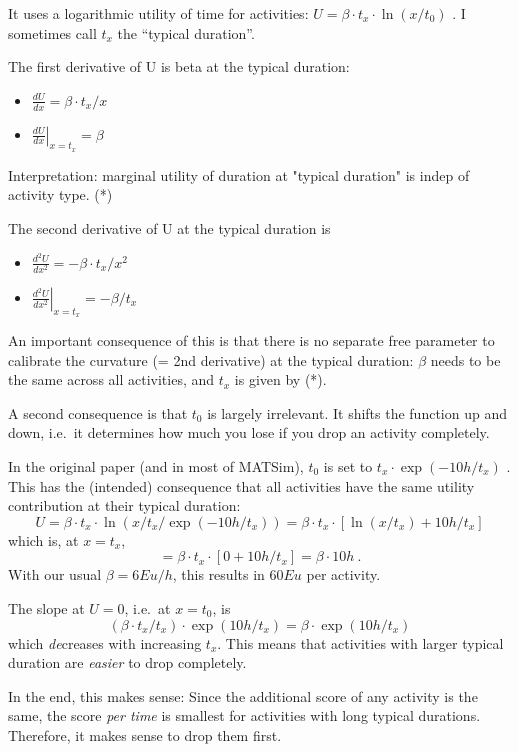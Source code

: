 It uses a logarithmic utility of time for activities: $U = \beta \cdot t_x \cdot  \ln(x/t_0)$ . I sometimes call $t_x$ the ``typical duration''.

The first derivative of U is beta at the typical duration:
\begin{itemize}
	\item 
$\displaystyle
\frac{dU}{dx} = \beta \cdot t_x / x
$
	\item 
$\displaystyle
\left. \frac{dU}{dx}\right|_{x=t_x} = \beta
$
\end{itemize}

Interpretation: marginal utility of duration at "typical duration" is indep of activity type. (*)

The second derivative of U at the typical duration is
\begin{itemize}
	\item 
$\displaystyle
\frac{d^2U}{dx^2} = - \beta \cdot t_x / x^2
$
	\item 
$\displaystyle
\left. \frac{d^2U}{dx^2} \right|_{x=t_x} = - \beta / t_x
$
\end{itemize}

An  important consequence of this is that there is no separate  free  parameter to calibrate the curvature (= 2nd derivative) at the  typical  duration: $\beta$ needs to be the same across all activities, and  $t_x$ is  given by (*).

A second consequence is that $t_0$ is largely  irrelevant. It  shifts the function up and down, i.e.\ it determines how  much you lose  if you drop an activity completely.

In the  original paper (and in most of MATSim), $t_0$ is set to $t_x \cdot   \exp(-10h/t_x)$ . This has the (intended) consequence that all  activities  have the same utility contribution at their typical  duration:
\[
U = \beta \cdot t_x \cdot \ln( x / t_x / \exp(-10h/t_x) ) 
%
= \beta \cdot t_x \cdot [ \ln( x/t_x ) + 10h/t_x ]
\]
which   is, at $x=t_x$,
\[
= \beta \cdot t_x \cdot [ 0 + 10h/t_x ] = \beta \cdot  10h \ . 
\]
With  our usual $\beta = 6Eu/h$, this results in $60Eu$ per  activity.

The slope at $U=0$, i.e.\ at $x=t_0$, is
\[
(\beta \cdot t_x / t_x) \cdot \exp( 10h/t_x) = \beta \cdot \exp( 10h/t_x )
\]
which \emph{de}creases with increasing $t_x$. This means that activities with larger typical duration are \emph{easier} to drop completely.

In the end, this makes sense: Since the additional score of any activity is the same, the score \emph{per time} is smallest for activities with long typical durations. Therefore, it makes sense to drop them first.

